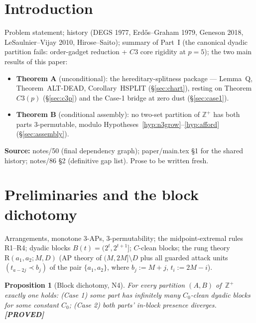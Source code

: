 \documentclass[11pt]{article}
\newtheorem{proposition}[theorem]{Proposition}
\theoremstyle{definition}
\newcommand{\Z}{\mathbb{Z}}
\newcommand{\Rung}{\mathrm{R}}
\newcommand{\source}[1]{\par\smallskip\noindent\textbf{Source:} {#1}\par}
\newcommand{\status}[1]{\textbf{[#1]}}
\begin{document}
\section{Introduction}\label{sec:intro}

Problem statement; history (DEGS 1977, Erd\H{o}s--Graham 1979, Geneson 2018,
LeSaulnier--Vijay 2010, Hirose--Saito); summary of Part~I (the canonical
dyadic partition fails: order-gadget reduction + $C3$ core rigidity at
$p = 5$); the two main results of this paper:

\begin{itemize}
\item \textbf{Theorem A} (unconditional): the hereditary-splitness package ---
  Lemma~Q, Theorem~ALT-DEAD, Corollary~HSPLIT (\S\ref{sec:chart}), resting on
  Theorem~$C3(p)$ (\S\ref{sec:c3p}) and the Case-1 bridge at zero dust
  (\S\ref{sec:case1}).
\item \textbf{Theorem B} (conditional assembly): no two-set partition of
  $\Z^+$ has both parts 3-permutable, modulo
  Hypotheses~\ref{hyp:n3grow}--\ref{hyp:afford} (\S\ref{sec:assembly}).
\end{itemize}

\source{notes/50 (final dependency graph); paper/main.tex \S1 for the shared
history; notes/86 \S2 (definitive gap list).  Prose to be written fresh.}

\section{Preliminaries and the block dichotomy}\label{sec:prelim}

Arrangements, monotone 3-APs, 3-permutability; the midpoint-extremal rules
R1--R4; dyadic blocks $B(t) = (2^t, 2^{t+1}]$; $C$-clean blocks; the rung
theory $\Rung(a_1, a_2; M, D)$ (AP theory of $(M,2M] \setminus D$ plus all
guarded attack units $(t_{a-2j} \prec b_j)$ of the pair $\{a_1, a_2\}$, where
$b_j := M+j$, $t_i := 2M-i$).

\begin{proposition}[Block dichotomy, N4]\label{prop:n4}
For every partition $(A, B)$ of\, $\Z^+$ exactly one holds:
\emph{(Case 1)} some part has infinitely many $C_0$-clean dyadic blocks for
some constant $C_0$; \emph{(Case 2)} both parts' in-block presence diverges.
\status{PROVED}
\end{proposition}
\end{document}
